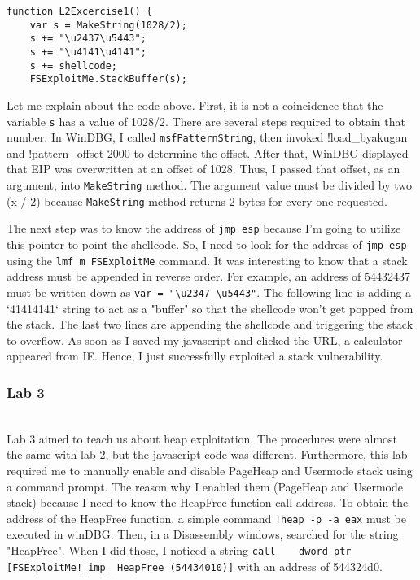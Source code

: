 \documentclass[letterpaper,10pt,titlepage,draftclsnofoot,onecolumn]{IEEEtran}
\begin{document}
\begin{lstlisting}
function L2Excercise1() {
	var s = MakeString(1028/2);
	s += "\u2437\u5443";
	s += "\u4141\u4141";
	s += shellcode;
	FSExploitMe.StackBuffer(s);

\end{lstlisting}

Let me explain about the code above.
First, it is not a coincidence that the variable \verb|s| has a value of 1028/2.
There are several steps required to obtain that number.
In WinDBG, I called \verb|msfPatternString|, then invoked !load\_byakugan and !pattern\_offset 2000 to determine the offset. 
After that, WinDBG displayed that EIP was overwritten at an offset of 1028. 
Thus, I passed that offset, as an argument, into \verb|MakeString| method. 
The argument value must be divided by two (x / 2) because \verb|MakeString| method returns 2 bytes for every one requested. 

The next step was to know the address of \verb|jmp esp| because I'm going to utilize this pointer to point the shellcode.
So, I need to look for the address of \verb|jmp esp| using the \verb|lmf m FSExploitMe| command. 
It was interesting to know that a stack address must be appended in reverse order. For example, an address of 54432437 must be written down as \verb|var = "\u2347 \u5443"|.
The following line is adding a `41414141` string to act as a "buffer" so that the shellcode won't get popped from the stack.
The last two lines are appending the shellcode and triggering the stack to overflow. 
As soon as I saved my javascript and clicked the URL, a calculator appeared from IE.
Hence, I just successfully exploited a stack vulnerability.
\hfill\\
\subsubsection{Lab 3}
\hfill\\
Lab 3 aimed to teach us about heap exploitation.
The procedures were almost the same with lab 2, but the javascript code was different.
Furthermore, this lab required me to manually enable and disable PageHeap and Usermode stack using a command prompt.
The reason why I enabled them (PageHeap and Usermode stack) because I need to know the HeapFree function call address.
To obtain the address of the HeapFree function, a simple command \verb|!heap -p -a eax| must be executed in winDBG.
Then, in a Disassembly windows, searched for the string "HeapFree".
When I did those, I noticed a string \verb|call    dword ptr [FSExploitMe!_imp__HeapFree (54434010)]| with an address of 544324d0.
\end{document}
